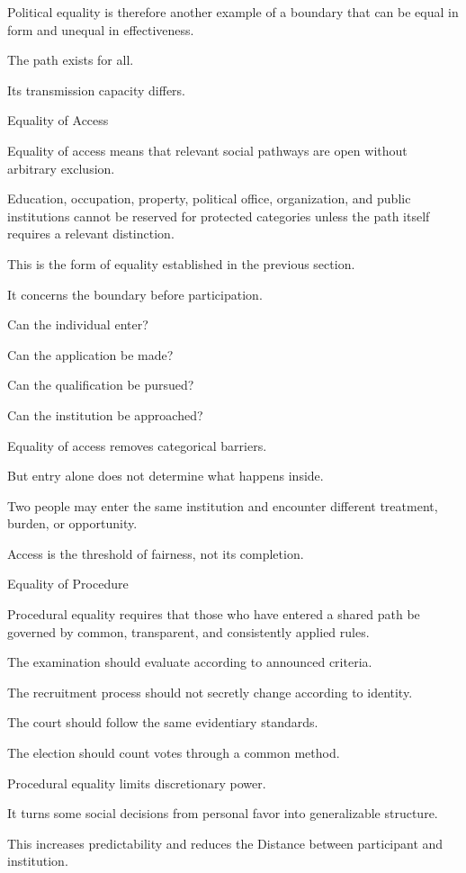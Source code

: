 Political equality is therefore another example of a boundary that can be equal in form and unequal in effectiveness.

The path exists for all.

Its transmission capacity differs.

Equality of Access

Equality of access means that relevant social pathways are open without arbitrary exclusion.

Education, occupation, property, political office, organization, and public institutions cannot be reserved for protected categories unless the path itself requires a relevant distinction.

This is the form of equality established in the previous section.

It concerns the boundary before participation.

Can the individual enter?

Can the application be made?

Can the qualification be pursued?

Can the institution be approached?

Equality of access removes categorical barriers.

But entry alone does not determine what happens inside.

Two people may enter the same institution and encounter different treatment, burden, or opportunity.

Access is the threshold of fairness, not its completion.

Equality of Procedure

Procedural equality requires that those who have entered a shared path be governed by common, transparent, and consistently applied rules.

The examination should evaluate according to announced criteria.

The recruitment process should not secretly change according to identity.

The court should follow the same evidentiary standards.

The election should count votes through a common method.

Procedural equality limits discretionary power.

It turns some social decisions from personal favor into generalizable structure.

This increases predictability and reduces the Distance between participant and institution.


